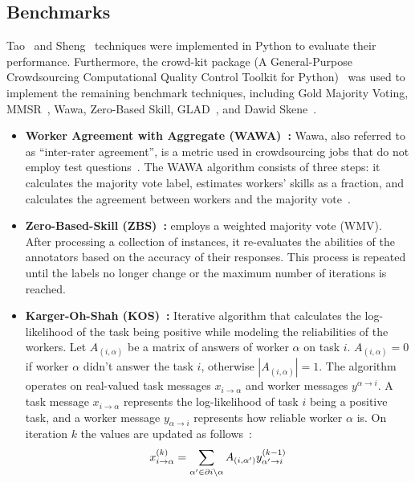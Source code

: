 \subsection{Benchmarks}
Tao~\cite{tao_Label_2020} and Sheng~\cite{sheng_Majority_2019} techniques were implemented in Python to evaluate their performance. Furthermore, the crowd-kit package (A General-Purpose Crowdsourcing Computational Quality Control Toolkit for Python)~\cite{ustalov_learning_2021 } was used to implement the remaining benchmark techniques, including Gold Majority Voting, MMSR~\cite{ma_Adversarial_2020}, Wawa, Zero-Based Skill, GLAD~\cite{whitehill_Whose_2009}, and Dawid Skene~\cite{dawid_Maximum_1979}.
%
\begin{itemize}
    \item \textbf{Worker Agreement with Aggregate (WAWA)~\cite{crowdkit_webpage_documentation}:} Wawa, also referred to as ``inter-rater agreement'', is a metric used in crowdsourcing jobs that do not employ test questions~\cite{appen_wawa_2023}. The WAWA algorithm consists of three steps: it calculates the majority vote label, estimates workers' skills as a fraction, and calculates the agreement between workers and the majority vote~\cite{crowdkit_webpage_documentation}.
    \item \textbf{Zero-Based-Skill (ZBS)~\cite{crowdkit_webpage_documentation}:} employs a weighted majority vote (WMV). After processing a collection of instances, it re-evaluates the abilities of the annotators based on the accuracy of their responses. This process is repeated until the labels no longer change or the maximum number of iterations is reached.
    \item \textbf{Karger-Oh-Shah (KOS)~\cite{crowdkit_webpage_documentation}:} Iterative algorithm that calculates the log-likelihood of the task being positive while modeling the reliabilities of the workers. Let $A_{(i,\alpha)}$ be a matrix of answers of worker $\alpha$ on task $i$. $A_{(i,\alpha)} = 0$ if worker $\alpha$ didn't answer the task $i$, otherwise $|A_{(i,\alpha)}| = 1$. The algorithm operates on real-valued task messages $x_{i \rightarrow \alpha}$  and worker messages $y^{\alpha \rightarrow i}$. A task message $x_{i \rightarrow \alpha}$ represents the log-likelihood of task $i$ being a positive task, and a worker message $y_{\alpha \rightarrow i}$ represents how reliable worker $\alpha$ is. On iteration $k$ the values are updated as follows~\cite{crowdkit_webpage_documentation}:
    \begin{equation}
        x_{i \rightarrow \alpha}^{(k)} = \sum_{\alpha' \in \partial i \backslash \alpha} A_{(i, \alpha')} y_{\alpha' \rightarrow i}^{(k-1)} \\

\end{equation}
\end{itemize}
